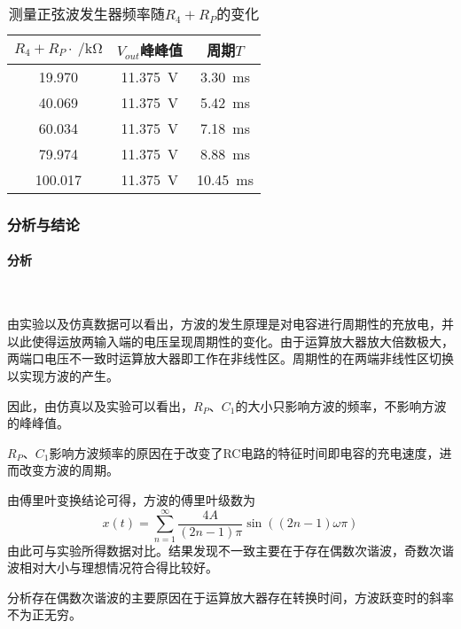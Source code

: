 \documentclass[UTF8]{ctexart}
\numberwithin{figure}{subsection}
\numberwithin{table}{subsection}
\numberwithin{equation}{subsection}
\begin{document}
\begin{table}[h]
    \begin{center}
        \caption{测量正弦波发生器频率随\(R_4+R_P\)的变化}
        \begin{tabular}{|c|c|c|}
            \hline
            \(R_4+R_P\cdot \SI{}{\per\kilo\ohm}\) & \(V_{out}\)峰峰值 & 周期\(T\) \\
            \hline
            19.970 & \SI{11.375}{\volt} & \SI{3.30}{\milli\second} \\
            \hline
            40.069 & \SI{11.375}{\volt} & \SI{5.42}{\milli\second} \\
            \hline
            60.034 & \SI{11.375}{\volt} & \SI{7.18}{\milli\second} \\
            \hline
            79.974 & \SI{11.375}{\volt} & \SI{8.88}{\milli\second} \\
            \hline
            100.017 & \SI{11.375}{\volt} & \SI{10.45}{\milli\second} \\
            \hline
        \end{tabular}
    \end{center}
    \label{square wave f exp data}
\end{table}


\subsubsection{分析与结论}
\paragraph{分析}~{}
\par 由实验以及仿真数据可以看出，方波的发生原理是对电容进行周期性的充放电，并以此使得运放两输入端的电压呈现周期性的变化。由于运算放大器放大倍数极大，两端口电压不一致时运算放大器即工作在非线性区。周期性的在两端非线性区切换以实现方波的产生。
\par 因此，由仿真以及实验可以看出，\(R_P\)、\(C_1\)的大小只影响方波的频率，不影响方波的峰峰值。
\par \(R_P\)、\(C_1\)影响方波频率的原因在于改变了RC电路的特征时间即电容的充电速度，进而改变方波的周期。
\par 由傅里叶变换结论可得，方波的傅里叶级数为
\[x\left(t\right) = \sum_{n = 1}^{\infty} \frac{4A}{\left(2n-1\right)\pi}\sin\left(\left(2n-1\right)\omega\pi\right)\]
由此可与实验所得数据对比。结果发现不一致主要在于存在偶数次谐波，奇数次谐波相对大小与理想情况符合得比较好。
\par 分析存在偶数次谐波的主要原因在于运算放大器存在转换时间，方波跃变时的斜率不为正无穷。
\end{document}
